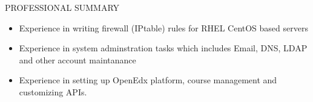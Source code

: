 \documentclass{resume} %
\begin{document}
\begin{rSection}{PROFESSIONAL SUMMARY}
\begin{itemize}
  \item Experience in writing firewall (IPtable) rules for
    RHEL CentOS based servers
    
  \item Experience in system adminstration tasks which includes Email,
    DNS, LDAP and other account maintanance
    
  \item Experience in setting up OpenEdx platform, course
    management and customizing APIs.

  \end{itemize}

\end{rSection}

\end{document}
